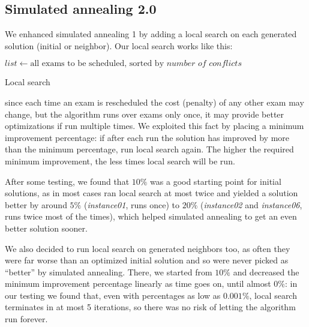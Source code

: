 \documentclass[11pt, a4paper, leqno]{article}
\begin{document}
	\subsection{Simulated annealing 2.0}
	
	We enhanced simulated annealing 1 by adding a local search on each generated solution (initial or neighbor). Our local search works like this:
	
	\begin{algorithm}[H]
		$list \gets \text{all exams to be scheduled, sorted by }\textit{number of conflicts}$\;
		\caption{Local search}
	\end{algorithm}
	
	since each time an exam is rescheduled the cost (penalty) of any other exam may change, but the algorithm runs over exams only once, it may provide better optimizations if run multiple times. We exploited this fact by placing a minimum improvement percentage: if after each run the solution has improved by more than the minimum percentage, run local search again. The higher the required minimum improvement, the less times local search will be run.
	
	After some testing, we found that $10\%$ was a good starting point for initial solutions, as in most cases ran local search at most twice and yielded a solution better by around $5\%$ (\textit{instance01}, runs once) to $20\%$ (\textit{instance02} and \textit{instance06}, runs twice most of the times), which helped simulated annealing to get an even better solution sooner.
	
	We also decided to run local search on generated neighbors too, as often they were far worse than an optimized initial solution and so were never picked as ``better'' by simulated annealing. There, we started from $10\%$ and decreased the minimum improvement percentage linearly as time goes on, until almost $0\%$: in our testing we found that, even with percentages as low as $0.001\%$, local search terminates in at most 5 iterations, so there was no risk of letting the algorithm run forever.
	
\end{document}

